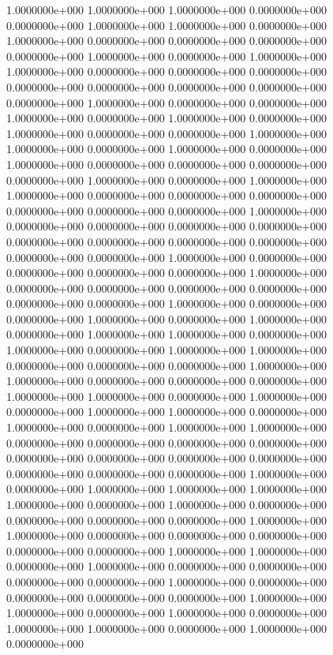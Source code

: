   1.0000000e+000  1.0000000e+000  1.0000000e+000  0.0000000e+000  0.0000000e+000
  1.0000000e+000  1.0000000e+000  0.0000000e+000  1.0000000e+000  0.0000000e+000
  0.0000000e+000  0.0000000e+000  0.0000000e+000  1.0000000e+000  0.0000000e+000
  1.0000000e+000  1.0000000e+000  0.0000000e+000  0.0000000e+000  0.0000000e+000
  0.0000000e+000  0.0000000e+000  0.0000000e+000  0.0000000e+000  0.0000000e+000
  1.0000000e+000  0.0000000e+000  0.0000000e+000  1.0000000e+000  0.0000000e+000
  1.0000000e+000  0.0000000e+000  1.0000000e+000  0.0000000e+000  0.0000000e+000
  1.0000000e+000  1.0000000e+000  0.0000000e+000  1.0000000e+000  0.0000000e+000
  1.0000000e+000  0.0000000e+000  0.0000000e+000  0.0000000e+000  0.0000000e+000
  1.0000000e+000  0.0000000e+000  1.0000000e+000  1.0000000e+000  0.0000000e+000
  0.0000000e+000  0.0000000e+000  0.0000000e+000  0.0000000e+000  0.0000000e+000
  1.0000000e+000  0.0000000e+000  0.0000000e+000  0.0000000e+000  0.0000000e+000
  0.0000000e+000  0.0000000e+000  0.0000000e+000  0.0000000e+000  0.0000000e+000
  0.0000000e+000  1.0000000e+000  0.0000000e+000  0.0000000e+000  0.0000000e+000
  0.0000000e+000  1.0000000e+000  0.0000000e+000  0.0000000e+000  0.0000000e+000
  0.0000000e+000  0.0000000e+000  0.0000000e+000  1.0000000e+000  0.0000000e+000
  0.0000000e+000  1.0000000e+000  0.0000000e+000  1.0000000e+000  0.0000000e+000
  1.0000000e+000  1.0000000e+000  0.0000000e+000  1.0000000e+000  0.0000000e+000
  1.0000000e+000  1.0000000e+000  0.0000000e+000  0.0000000e+000  0.0000000e+000
  1.0000000e+000  1.0000000e+000  0.0000000e+000  0.0000000e+000  0.0000000e+000
  1.0000000e+000  1.0000000e+000  0.0000000e+000  1.0000000e+000  0.0000000e+000
  1.0000000e+000  1.0000000e+000  0.0000000e+000  1.0000000e+000  0.0000000e+000
  1.0000000e+000  1.0000000e+000  0.0000000e+000  0.0000000e+000  0.0000000e+000
  0.0000000e+000  0.0000000e+000  0.0000000e+000  0.0000000e+000  0.0000000e+000
  0.0000000e+000  0.0000000e+000  0.0000000e+000  1.0000000e+000  0.0000000e+000
  1.0000000e+000  1.0000000e+000  1.0000000e+000  1.0000000e+000  0.0000000e+000
  1.0000000e+000  0.0000000e+000  0.0000000e+000  0.0000000e+000  0.0000000e+000
  1.0000000e+000  1.0000000e+000  0.0000000e+000  0.0000000e+000  0.0000000e+000
  0.0000000e+000  0.0000000e+000  1.0000000e+000  1.0000000e+000  0.0000000e+000
  1.0000000e+000  0.0000000e+000  0.0000000e+000  0.0000000e+000  0.0000000e+000
  1.0000000e+000  0.0000000e+000  0.0000000e+000  0.0000000e+000  0.0000000e+000
  1.0000000e+000  1.0000000e+000  0.0000000e+000  1.0000000e+000  0.0000000e+000
  1.0000000e+000  1.0000000e+000  0.0000000e+000  1.0000000e+000  0.0000000e+000
